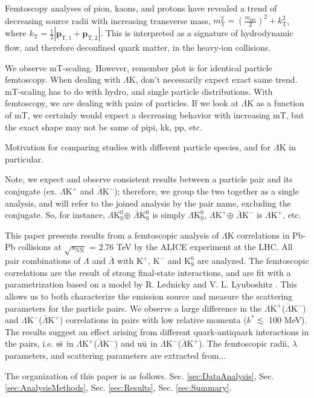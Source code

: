 \documentclass[ALICE,manyauthors]{cernphprep}
\newcommand{\kstar}{$k^{*}$\xspace}
\newcommand{\Lam}{$\Lambda$\xspace}
\newcommand{\ALam}{$\bar{\Lambda}$\xspace}
\newcommand{\KchP}{$\mathrm{K^{+}}$\xspace}
\newcommand{\KchM}{$\mathrm{K^{-}}$\xspace}
\newcommand{\Ks}{$\mathrm{K^{0}_{S}}$\xspace}
\newcommand{\LamK}{$\Lambda$K\xspace}
\newcommand{\LamKchP}{$\Lambda\mathrm{K^{+}}$\xspace}
\newcommand{\ALamKchM}{$\bar{\Lambda}\mathrm{K^{-}}$\xspace}
\newcommand{\LamKchPALamKchM}{$\Lambda\mathrm{K^{+}}$($\bar{\Lambda}\mathrm{K^{-}}$)\xspace}
\newcommand{\LamKchMALamKchP}{$\Lambda\mathrm{K^{-}}$($\bar{\Lambda}\mathrm{K^{+}}$)\xspace}
\newcommand{\LamKs}{$\Lambda\mathrm{K^{0}_{S}}$\xspace}
\newcommand{\ALamKs}{$\bar{\Lambda}\mathrm{K^{0}_{S}}$\xspace}
\begin{document}
Femtoscopy analyses of pion, kaons, and protons have revealed a trend of decreasing source radii with increasing transverse mass, $m_{\mathrm{T}}^{2} = (\frac{m_{\mathrm{inv}}}{2})^{2} + k_{\mathrm{T}}^{2}$, where $k_{\mathrm{T}} = \frac{1}{2}|\mathbf{p}_{\mathrm{T},1} + \mathbf{p}_{\mathrm{T},2}|$.  This is interpreted as a signature of hydrodynamic flow, and therefore deconfined quark matter, in the heavy-ion collisions.

We observe mT-scaling.  However, remember plot is for identical particle femtoscopy.  When dealing with \LamK, don't necessarily expect exact same trend.  mT-scaling has to do with hydro, and single particle distributions.  With femtoscopy, we are dealing with pairs of particles.  If we look at \LamK as a function of mT, we certainly would expect a decreasing behavior with increasing mT, but the exact shape may not be same of pipi, kk, pp, etc.


Motivation for comparing studies with different particle species, and for \LamK in particular.

Note, we expect and observe consistent results between a particle pair and its conjugate (ex. \LamKchP and \ALamKchM); therefore, we group the two together as a single analysis, and will refer to the joined analysis by the pair name, excluding the conjugate.  
So, for instance, \LamKs $\oplus$ \ALamKs is simply \LamKs, \LamKchP $\oplus$ \ALamKchM is \LamKchP, etc. 


This paper presents results from a femtoscopic analysis of \LamK correlations in Pb-Pb collisions at $\sqrt{s_{\mathrm{NN}}}$ = 2.76 TeV by the ALICE experiment at the LHC.  
All pair combinations of \Lam and \ALam with \KchP, \KchM and \Ks are analyzed. 
The femtoscopic correlations are the result of strong final-state interactions, and are fit with a parametrization based on a model by R. Lednicky and V. L. Lyuboshitz \cite{Lednicky:82}.  
This allows us to both characterize the emission source and measure the scattering parameters for the particle pairs.  
We observe a large difference in the \LamKchPALamKchM and \LamKchMALamKchP correlations in pairs with low relative momenta (\kstar $\lesssim$ 100 MeV).  
The results suggest an effect arising from different quark-antiquark interactions in the pairs, i.e. $\rm s\bar{s}$ in \LamKchPALamKchM and $\rm u\bar{u}$ in \LamKchMALamKchP.  
The femtoscopic radii, $\lambda$ parameters, and scattering parameters are extracted from...

The organization of this paper is as follows.  Sec. \ref{sec:DataAnalysis}, Sec. \ref{sec:AnalysisMethods}, Sec. \ref{sec:Results}, Sec. \ref{sec:Summary}.
\end{document}
